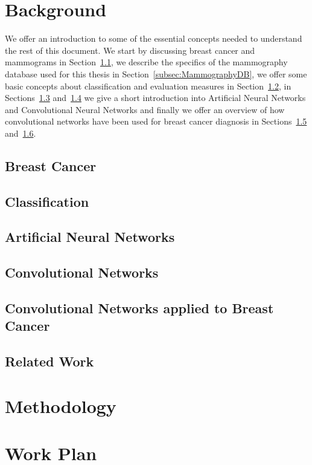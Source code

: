 \documentclass[11pt]{article}
\begin{document}
\section{Background}
We offer an introduction to some of the essential concepts needed to understand the rest of this document. We start by discussing breast cancer and mammograms in Section~\ref{subsec:BreastCancer}, we describe the specifics of the mammography database used for this thesis in Section~\ref{subsec:MammographyDB}, we offer some basic concepts about classification and evaluation measures in Section~\ref{subsec:Classification}, in Sections~\ref{subsec:ANNs} and~\ref{subsec:ConvNets} we give a short introduction into Artificial Neural Networks and Convolutional Neural Networks and finally we offer an overview of how convolutional networks have been used for breast cancer diagnosis in Sections~\ref{subsec:BreastCancerConvNets} and~\ref{subsec:RelatedWork}.

	\subsection{Breast Cancer}
	\label{subsec:BreastCancer}
	


	\subsection{Classification}
	\label{subsec:Classification}
	

	\subsection{Artificial Neural Networks}
	\label{subsec:ANNs}

	\subsection{Convolutional Networks}
	\label{subsec:ConvNets}

	\subsection{Convolutional Networks applied to Breast Cancer}
	\label{subsec:BreastCancerConvNets}	

	\subsection{Related Work}
	\label{subsec:RelatedWork}
	

\section{Methodology}
\label{sec:Methodology}


\section{Work Plan}




\end{document}
